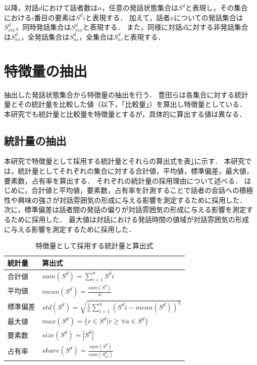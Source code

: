 以降，対話$d$におけて話者数は$n$，任意の発話状態集合は$S^d$と表現し，その集合における$i$番目の要素は$S^di$と表現する．
加えて，話者$x$についての発話集合は$S^d_{stx}$，同時発話集合は$S^d_{ssx}$と表現する．
また，同様に対話$d$に対する非発話集合は$S^d_{ns}$，全発話集合は$S^d_{us}$，全集合は$S^d_{as}$と表現する．

\section{特徴量の抽出}

抽出した発話状態集合から特徴量の抽出を行う．
豊田らは各集合に対する統計量とその統計量を比較した値（以下，「比較量」）を算出し特徴量としている．
本研究でも統計量と比較量を特徴量とするが，具体的に算出する値は異なる．

\subsection{統計量の抽出}

本研究で特徴量として採用する統計量とそれらの算出式を表\ref{tab:statistics_and_formulas}に示す．
本研究では，統計量としてそれぞれの集合に対する合計値，平均値，標準偏差，最大値，要素数，占有率を算出する．
それぞれの統計量の採用理由について述べる．
はじめに，合計値と平均値，要素数，占有率を計測することで話者の会話への積極性や興味の強さが対話雰囲気の形成に与える影響を測定するために採用した．
次に，標準偏差は話者間の発話の偏りが対話雰囲気の形成に与える影響を測定するために採用した．
最大値は対話における発話時間の値域が対話雰囲気の形成に与える影響を測定するために採用した．

\begingroup
\renewcommand{\arraystretch}{1.5}
\begin{table}[t]
    \caption{特徴量として採用する統計量と算出式}
    \centering
    \begin{tabular}{ll}
        \hline
        統計量 & 算出式 \\
        \hline\hline
        合計値 & $sum(S^d) = \sum_{i=1}^n S^di$ \\
        \hline
        平均値 & $mean(S^d) = \frac{sum(S^d)}{n}$ \\
        \hline
        標準偏差 & $std(S^d) = \sqrt{\frac{1}{n}\sum_{i=1}^n (S^di - mean(S^d))^2}$ \\
        \hline
        最大値 & $max(S^d) = \{r\in{S^d} | r \geq \forall{a}\in{S^d} \}$ \\
        \hline
        要素数  & $size(S^d) = |S^d|$ \\
        \hline
        占有率  & $share(S^d) = \frac{sum(S^d)}{sum(S^d_{as})}$ \\
        \hline
    \end{tabular}
    \label{tab:statistics_and_formulas}
\end{table}
\endgroup

